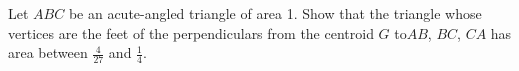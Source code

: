 Let $ABC$ be an acute-angled triangle of area 1. Show that the triangle whose vertices are the feet of the perpendiculars from the centroid $G$ to$AB$,  $BC$,  $CA$ has area between $\frac 4{27}$ and $\frac 14$.